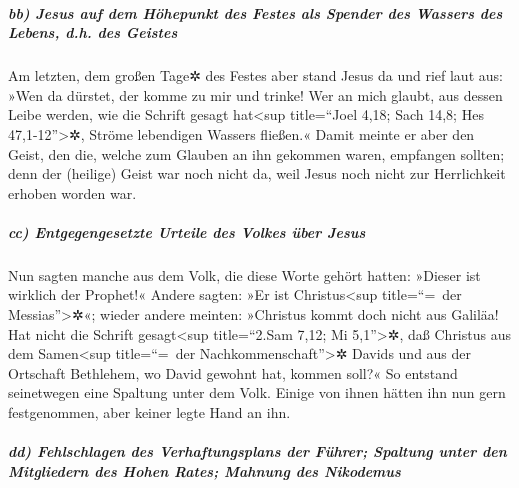\hypertarget{bb-jesus-auf-dem-huxf6hepunkt-des-festes-als-spender-des-wassers-des-lebens-d.h.-des-geistes}{%
\subparagraph{bb) Jesus auf dem Höhepunkt des Festes als Spender des
Wassers des Lebens, d.h. des
Geistes}\label{bb-jesus-auf-dem-huxf6hepunkt-des-festes-als-spender-des-wassers-des-lebens-d.h.-des-geistes}}

 Am letzten, dem großen Tage✲ des Festes aber stand Jesus
da und rief laut aus: »Wen da dürstet, der komme zu mir und trinke!
 Wer an mich glaubt, aus dessen Leibe werden, wie die
Schrift gesagt hat\textless sup title=``Joel 4,18; Sach 14,8; Hes
47,1-12''\textgreater✲, Ströme lebendigen Wassers fließen.«
 Damit meinte er aber den Geist, den die, welche zum
Glauben an ihn gekommen waren, empfangen sollten; denn der (heilige)
Geist war noch nicht da, weil Jesus noch nicht zur Herrlichkeit erhoben
worden war.

\hypertarget{cc-entgegengesetzte-urteile-des-volkes-uxfcber-jesus}{%
\subparagraph{cc) Entgegengesetzte Urteile des Volkes über
Jesus}\label{cc-entgegengesetzte-urteile-des-volkes-uxfcber-jesus}}

 Nun sagten manche aus dem Volk, die diese Worte gehört
hatten: »Dieser ist wirklich der Prophet!«  Andere
sagten: »Er ist Christus\textless sup title=``=~der
Messias''\textgreater✲«; wieder andere meinten: »Christus kommt doch
nicht aus Galiläa!  Hat nicht die Schrift
gesagt\textless sup title=``2.Sam 7,12; Mi 5,1''\textgreater✲, daß
Christus aus dem Samen\textless sup title=``=~der
Nachkommenschaft''\textgreater✲ Davids und aus der Ortschaft Bethlehem,
wo David gewohnt hat, kommen soll?«  So entstand
seinetwegen eine Spaltung unter dem Volk.  Einige von
ihnen hätten ihn nun gern festgenommen, aber keiner legte Hand an ihn.

\hypertarget{dd-fehlschlagen-des-verhaftungsplans-der-fuxfchrer-spaltung-unter-den-mitgliedern-des-hohen-rates-mahnung-des-nikodemus}{%
\subparagraph{dd) Fehlschlagen des Verhaftungsplans der Führer; Spaltung
unter den Mitgliedern des Hohen Rates; Mahnung des
Nikodemus}\label{dd-fehlschlagen-des-verhaftungsplans-der-fuxfchrer-spaltung-unter-den-mitgliedern-des-hohen-rates-mahnung-des-nikodemus}}


